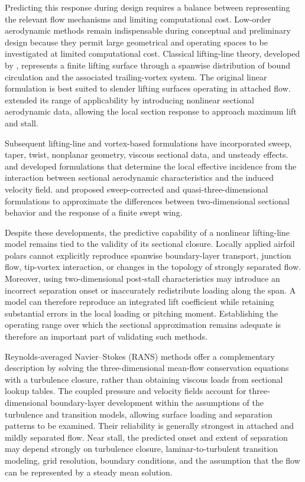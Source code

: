 \documentclass[journal ]{new-aiaa}
\begin{document}
Predicting this response during design requires a balance between representing the relevant flow mechanisms and limiting computational cost. Low-order aerodynamic methods remain indispensable during conceptual and preliminary design because they permit large geometrical and operating spaces to be investigated at limited computational cost.
Classical lifting-line theory, developed by \citet{Prandtl1921}, represents a finite lifting surface through a spanwise distribution of bound circulation and the associated trailing-vortex system.
The original linear formulation is best suited to slender lifting surfaces operating in attached flow. 
\citet{SivellsNeely1947} extended its range of applicability by introducing nonlinear sectional aerodynamic data, allowing the local section response to approach maximum lift and stall.

Subsequent lifting-line and vortex-based formulations have incorporated sweep, taper, twist, nonplanar geometry, viscous sectional data, and unsteady effects. 
\citet{SugarGabor2018} and \citet{ReidHunsaker2021} developed formulations that determine the local effective incidence from the interaction between sectional aerodynamic characteristics and the induced velocity field.
\citet{GallayGhasemiLaurendeau2014} and \citet{GoitiaLlamas2019} proposed sweep-corrected and quasi-three-dimensional formulations to approximate the differences between two-dimensional sectional behavior and the response of a finite swept wing.

Despite these developments, the predictive capability of a nonlinear lifting-line model remains tied to the validity of its sectional closure. 
Locally applied airfoil polars cannot explicitly reproduce spanwise boundary-layer transport, junction flow, tip-vortex interaction, or changes in the topology of strongly separated flow. 
Moreover, using two-dimensional post-stall characteristics may introduce an incorrect separation onset or inaccurately redistribute loading along the span. 
A model can therefore reproduce an integrated lift coefficient while retaining substantial errors in the local loading or pitching moment.
Establishing the operating range over which the sectional approximation remains adequate is therefore an important part of validating such methods.

Reynolds-averaged Navier--Stokes (RANS) methods offer a complementary description by solving the three-dimensional mean-flow conservation equations with a turbulence closure, rather than obtaining viscous loads from sectional lookup tables.
The coupled pressure and velocity fields account for three-dimensional boundary-layer development within the assumptions of the turbulence and transition models, allowing surface loading and separation patterns to be examined.
Their reliability is generally strongest in attached and mildly separated flow.
Near stall, the predicted onset and extent of separation may depend strongly on turbulence closure, laminar-to-turbulent transition modeling, grid resolution, boundary conditions, and the assumption that the flow can be represented by a steady mean solution.
\end{document}
